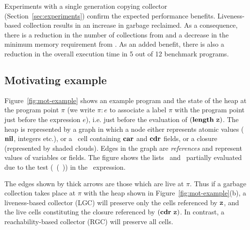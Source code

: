 \documentclass[preprint, 9pt]{sigplanconf}
\newcommand{\warning}[1]{{\color{Myred}{#1}}}
\begin{document}
Experiments  with  a   single  generation  copying  collector
  (Section~\ref{sec:experiments})  confirm  the  expected  performance
  benefits.   Liveness-based  collection  results in  an  increase  in
  garbage reclaimed.   As a  consequence, there is  a reduction  in the
  number of collections from \warning{1.6X to 23X} and a decrease in the
  minimum memory requirement from  \warning{1X to 1389X}. 
  As an added benefit, there is also a reduction in the overall
  execution time in 5 out of 12 benchmark programs.
 

\subsection{Motivating example}
\label{sec:motiv}

Figure~\ref{fig:mot-example} shows an example program and the state of
the heap at  the program point $\pi$ (we write $\pi\!:\!e$ to associate a label
$\pi$  with the  program point just
before the expression $e$), i.e. just  before the evaluation
of $(\mathbf{length}\  \mbox{\tt z})$.  The heap is  represented by a graph  in which a
node either  represents atomic  values ($\mbox{$\mathbf{ nil}$}$,  integers etc.),  or a
\CONS\  cell  containing  $\mbox{$\mathbf{car}$}$  and  $\mbox{$\mathbf{cdr}$}$  fields,  or  a  closure
(represented  by  shaded  clouds).   Edges   in  the  graph  are  {\em
  references} and represent values of  variables  or fields.  The figure shows
the  lists \px\  and  \pz\ partially  evaluated due to  the test (\NULLQ~(\CAR~\pz)) in the \SIF\ expression.


The edges  shown by thick  arrows are those  which are live  at $\pi$.
Thus if a garbage collection  takes place at
$\pi$ with the heap shown in Figure~\ref{fig:mot-example}(b), a
liveness-based collector (LGC) will preserve only the cells referenced
by  $\mbox{\tt z}$,  and the live cells  constituting the  closure
referenced by $(\mbox{$\mathbf{cdr}$}~\mbox{\tt z})$.   In contrast, a reachability-based
collector (RGC) will preserve all cells.
\end{document}
